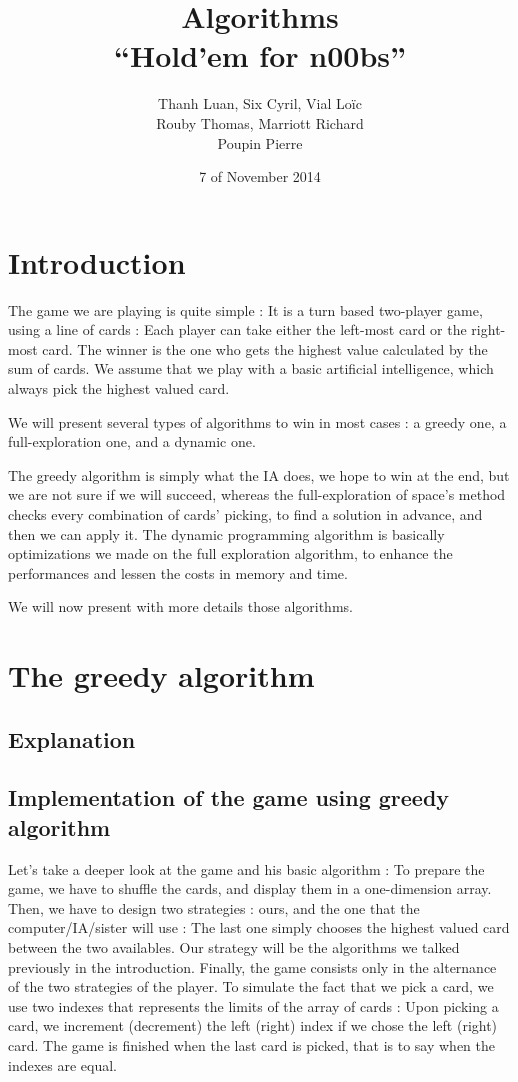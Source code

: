 \documentclass[11pt]{article}
\title{Algorithms \\
	\textbf{``Hold'em for n00bs''}}
\author{Thanh Luan, Six Cyril, Vial Loïc \\
			Rouby Thomas, Marriott Richard\\
			Poupin Pierre}
\date{7\up{th} of November 2014}
\begin{document}
\maketitle

\section{Introduction}
The game we are playing is quite simple : It is a turn based two-player game, using a line of cards : Each player can take either the left-most card or the right-most card.
The winner is the one who gets the highest value calculated by the sum of cards.
We assume that we play with a basic artificial intelligence, which always pick the highest valued card.

We will present several types of algorithms to win in most cases : a greedy one, a full-exploration one, and a dynamic one.

The greedy algorithm is simply what the IA does, we hope to win at the end, but we are not sure if we will succeed, whereas the full-exploration of space's method checks every combination of cards' picking, to find a solution in advance, and then we can apply it.
The dynamic programming algorithm is basically optimizations we made on the full exploration algorithm, to enhance the performances and lessen the costs in memory and time.

We will now present with more details those algorithms.


\section{The greedy algorithm}
\subsection{Explanation}

\subsection{Implementation of the game using greedy algorithm}
Let's take a deeper look at the game and his basic algorithm :
To prepare the game, we have to shuffle the cards, and display them in a one-dimension array.
Then, we have to design two strategies : ours, and the one that the computer/IA/sister will use : The last one simply chooses the highest valued card between the two availables.
Our strategy will be the algorithms we talked previously in the introduction.
Finally, the game consists only in the alternance of the two strategies of the player.
To simulate the fact that we pick a card, we use two indexes that represents the limits of the array of cards : Upon picking a card, we increment (decrement) the left (right) index if we chose the left (right) card. The game is finished when the last card is picked, that is to say when the indexes are equal.
\end{document}

